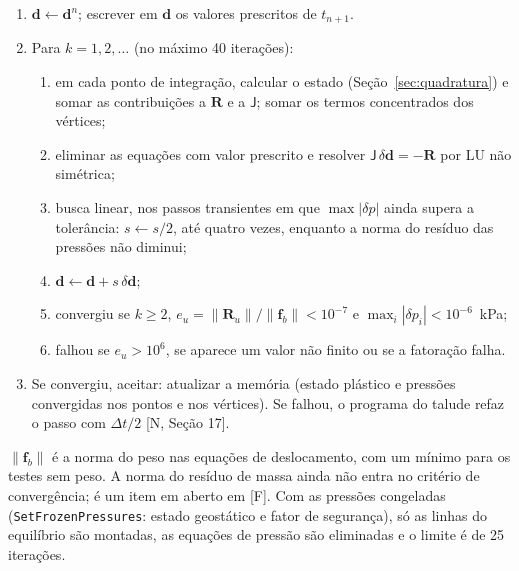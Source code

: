 \documentclass[11pt,a4paper]{article}
\newcommand{\mt}[1]{\mathsf{#1}}
\begin{document}
\begin{tcolorbox}[colback=black!3,colframe=black!45,boxrule=0.5pt,arc=2pt,
                  left=6pt,right=6pt,top=3pt,bottom=3pt]
\small
\begin{enumerate}[label=\arabic*.,leftmargin=*,itemsep=1pt]
\item $\mathbf d\leftarrow\mathbf d^{n}$; escrever em $\mathbf d$ os valores prescritos de $t_{n+1}$.
\item Para $k=1,2,\ldots$ (no máximo 40 iterações):
  \begin{enumerate}[label=(\alph*),leftmargin=*,itemsep=0pt]
  \item em cada ponto de integração, calcular o estado (Seção~\ref{sec:quadratura}) e somar
    as contribuições a $\mathbf R$ e a $\mt J$; somar os termos concentrados dos vértices;
  \item eliminar as equações com valor prescrito e resolver $\mt J\,\delta\mathbf d=-\mathbf R$
    por LU não simétrica;
  \item busca linear, nos passos transientes em que $\max|\delta p|$ ainda supera a
    tolerância: $s\leftarrow s/2$, até quatro vezes, enquanto a norma do resíduo das
    pressões não diminui;
  \item $\mathbf d\leftarrow\mathbf d+s\,\delta\mathbf d$;
  \item convergiu se $k\ge2$, $e_u=\|\mathbf R_u\|/\|\mathbf f_b\|<10^{-7}$ e
    $\max_i|\delta p_i|<10^{-6}$~kPa;
  \item falhou se $e_u>10^{6}$, se aparece um valor não finito ou se a fatoração falha.
  \end{enumerate}
\item Se convergiu, aceitar: atualizar a memória (estado plástico e pressões convergidas nos
  pontos e nos vértices). Se falhou, o programa do talude refaz o passo com $\Delta t/2$
  [N, Seção 17].
\end{enumerate}
\end{tcolorbox}

$\|\mathbf f_b\|$ é a norma do peso nas equações de deslocamento, com um mínimo para os
testes sem peso. A norma do resíduo de massa ainda não entra no critério de convergência; é
um item em aberto em [F]. Com as pressões congeladas (\texttt{SetFrozenPressures}: estado
geostático e fator de segurança), só as linhas do equilíbrio são montadas, as equações de
pressão são eliminadas e o limite é de 25 iterações.
\end{document}
